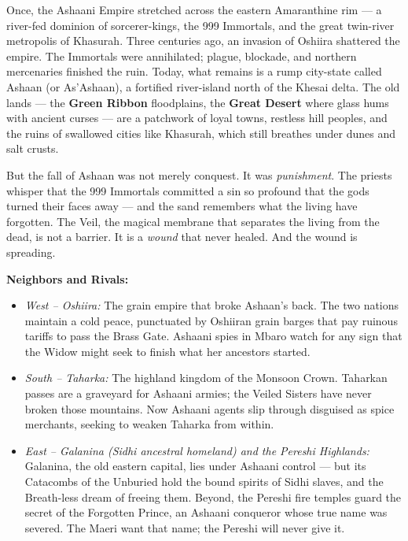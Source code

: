 \vspace{2mm}
\begin{tcolorbox}[colback=black!3,colframe=blue!60!black,title={Theme \& Atmosphere},breakable]
Once, the Ashaani Empire stretched across the eastern Amaranthine rim --- a river-fed dominion of sorcerer-kings, the 999 Immortals, and the great twin-river metropolis of Khasurah. Three centuries ago, an invasion of Oshiira shattered the empire. The Immortals were annihilated; plague, blockade, and northern mercenaries finished the ruin. Today, what remains is a rump city-state called Ashaan (or As'Ashaan), a fortified river-island north of the Khesai delta. The old lands --- the \textbf{Green Ribbon} floodplains, the \textbf{Great Desert} where glass hums with ancient curses --- are a patchwork of loyal towns, restless hill peoples, and the ruins of swallowed cities like Khasurah, which still breathes under dunes and salt crusts.

But the fall of Ashaan was not merely conquest. It was \emph{punishment}. The priests whisper that the 999 Immortals committed a sin so profound that the gods turned their faces away --- and the sand remembers what the living have forgotten. The Veil, the magical membrane that separates the living from the dead, is not a barrier. It is a \emph{wound} that never healed. And the wound is spreading.

\textbf{Neighbors and Rivals:}
\begin{itemize}
  \item \textit{West -- Oshiira:} The grain empire that broke Ashaan's back. The two nations maintain a cold peace, punctuated by Oshiiran grain barges that pay ruinous tariffs to pass the Brass Gate. Ashaani spies in Mbaro watch for any sign that the Widow might seek to finish what her ancestors started.
  \item \textit{South -- Taharka:} The highland kingdom of the Monsoon Crown. Taharkan passes are a graveyard for Ashaani armies; the Veiled Sisters have never broken those mountains. Now Ashaani agents slip through disguised as spice merchants, seeking to weaken Taharka from within.
  \item \textit{East -- Galanina (Sidhi ancestral homeland) and the Pereshi Highlands:} Galanina, the old eastern capital, lies under Ashaani control --- but its Catacombs of the Unburied hold the bound spirits of Sidhi slaves, and the Breath-less dream of freeing them. Beyond, the Pereshi fire temples guard the secret of the Forgotten Prince, an Ashaani conqueror whose true name was severed. The Maeri want that name; the Pereshi will never give it.
\end{itemize}


\end{tcolorbox}
